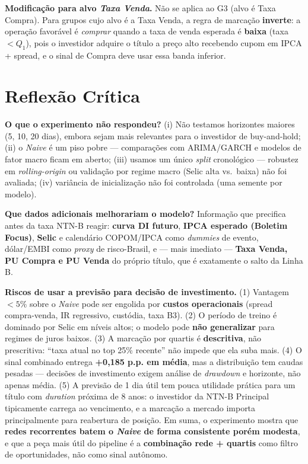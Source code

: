 \documentclass[11pt,a4paper]{article}
\begin{document}
\textbf{Modificação para alvo \emph{Taxa Venda}.} Não se aplica ao G3 (alvo é Taxa Compra). Para grupos cujo alvo é a Taxa Venda, a regra de marcação \textbf{inverte}: a operação favorável é \emph{comprar} quando a taxa de venda esperada é \textbf{baixa} (taxa $< Q_1$), pois o investidor adquire o título a preço alto recebendo cupom em IPCA + spread, e o sinal de Compra deve usar essa banda inferior.

\section{Reflexão Crítica}
\textbf{O que o experimento não respondeu?} (i) Não testamos horizontes maiores (5, 10, 20 dias), embora sejam mais relevantes para o investidor de buy-and-hold; (ii) o \emph{Naive} é um piso pobre --- comparações com ARIMA/GARCH e modelos de fator macro ficam em aberto; (iii) usamos um único \emph{split} cronológico --- robustez em \emph{rolling-origin} ou validação por regime macro (Selic alta vs.\ baixa) não foi avaliada; (iv) variância de inicialização não foi controlada (uma semente por modelo).

\textbf{Que dados adicionais melhorariam o modelo?} Informação que precifica antes da taxa NTN-B reagir: \textbf{curva DI futuro}, \textbf{IPCA esperado (Boletim Focus)}, \textbf{Selic} e calendário COPOM/IPCA como \emph{dummies} de evento, dólar/EMBI como \emph{proxy} de risco-Brasil, e --- mais imediato --- \textbf{Taxa Venda, PU Compra e PU Venda} do próprio título, que é exatamente o salto da Linha B.

\textbf{Riscos de usar a previsão para decisão de investimento.} (1) Vantagem $<5\%$ sobre o \emph{Naive} pode ser engolida por \textbf{custos operacionais} (spread compra-venda, IR regressivo, custódia, taxa B3). (2) O período de treino é dominado por Selic em níveis altos; o modelo pode \textbf{não generalizar} para regimes de juros baixos. (3) A marcação por quartis é \textbf{descritiva}, não prescritiva: ``taxa atual no top 25\% recente'' não impede que ela suba mais. (4) O sinal combinado entrega \textbf{+0,185 p.p. em média}, mas a distribuição tem caudas pesadas --- decisões de investimento exigem análise de \emph{drawdown} e horizonte, não apenas média. (5) A previsão de 1 dia útil tem pouca utilidade prática para um título com \emph{duration} próxima de 8 anos: o investidor da NTN-B Principal tipicamente carrega ao vencimento, e a marcação a mercado importa principalmente para reabertura de posição. Em suma, o experimento mostra que \textbf{redes recorrentes batem o \emph{Naive} de forma consistente porém modesta}, e que a peça mais útil do pipeline é a \textbf{combinação rede + quartis} como filtro de oportunidades, não como sinal autônomo.
\end{document}
